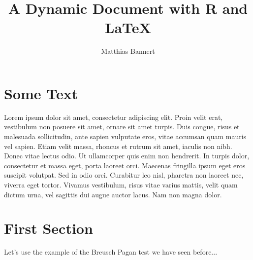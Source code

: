 \documentclass{article}\usepackage[]{graphicx}\usepackage[]{color}
\title{A Dynamic Document with R and \LaTeX}
\author{Matthias Bannert}
\begin{document}
\maketitle

\newpage

\section{Some Text}
Lorem ipsum dolor sit amet, consectetur adipiscing elit. Proin velit erat, vestibulum non posuere sit amet, ornare sit amet turpis. Duis congue, risus et malesuada sollicitudin, ante sapien vulputate eros, vitae accumsan quam mauris vel sapien. Etiam velit massa, rhoncus et rutrum sit amet, iaculis non nibh. Donec vitae lectus odio. Ut ullamcorper quis enim non hendrerit. In turpis dolor, consectetur et massa eget, porta laoreet orci. Maecenas fringilla ipsum eget eros suscipit volutpat. Sed in odio orci. Curabitur leo nisl, pharetra non laoreet nec, viverra eget tortor. Vivamus vestibulum, risus vitae varius mattis, velit quam dictum urna, vel sagittis dui augue auctor lacus. Nam non magna dolor.

\section{First Section}

Let's use the example of the Breusch Pagan test we have seen before... 
\end{document}

